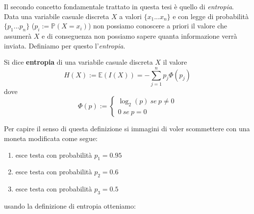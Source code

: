 Il secondo concetto fondamentale trattato in questa tesi è quello di \textit{entropia}.\\
Data una variabile casuale discreta $X$ a valori $\{ x_1...x_n \}$ e con legge di probabilità $\{p_1...p_n \}$ ($p_i:=\mathbb{P}(X=x_i)$) non possiamo conoscere a priori il valore che assumerà $X$ e di conseguenza non possiamo sapere quanta informazione verrà inviata. Definiamo per questo l'\textit{entropia}.
\begin{defi}
Si dice \textbf{entropia} di una variabile casuale discreta $X$ il valore
\begin{equation}
H(X):=\mathbb{E}(I(X))=-\sum_{j=1}^np_j\Phi(p_j)
\end{equation}
dove
$$
\Phi(p):=
\begin{cases}
\log_2 {(p)} \ se \ p \neq 0 \\
0 \ se \  p=0
\end{cases}
$$
\end{defi}
Per capire il senso di questa definizione si immagini di voler scommettere con una moneta modificata come segue:
\begin{enumerate}
\item esce testa con probabilità $p_1=0.95$
\item esce testa con probabilità $p_2=0.6$
\item esce testa con probabilità $p_3=0.5$
\end{enumerate} 
 usando la definizione di entropia otteniamo:
 
